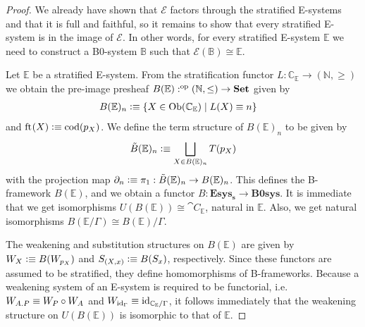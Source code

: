 \begin{proof}
We already have shown that $\mathcal{E}$ factors through the stratified
E-systems and that it is full and faithful, so it remains
to show that every stratified E-system is in the image of $\mathcal{E}$. In
other words, for every stratified E-system $\mathbb{E}$ we need to construct
a B0-system $\mathbb{B}$ such that $\mathcal{E}(\mathbb{B})\cong\mathbb{E}$. 

Let $\mathbb{E}$ be a stratified E-system. From the stratification functor
$L:\mathbb{C}_{\mathbb{E}}\to (\mathbb{N},\geq)$ we obtain the pre-image
presheaf $B(\mathbb{E}):\op{(\mathbb{N},\leq)}\to\mathbf{Set}$ given by
\begin{align*}
B(\mathbb{E})_n & \defeq \{X\in\mathrm{Ob}(\mathbb{C}_{\mathbb{E}})\mid L(X)\jdeq n\}
\end{align*}
and $\eft(X)\defeq\mathrm{cod}(p_X)$. We define the term structure of $B(\mathbb{E})_n$
to be given by
\begin{equation*}
\tilde{B}(\mathbb{E})_n \defeq \bigsqcup_{X\in B(\mathbb{E})_n} T(p_X)
\end{equation*}
with the projection map $\ebd[n]\defeq\pi_1:\tilde{B}(\mathbb{E})_n\to B(\mathbb{E})_n$.
This defines the B-framework $B(\mathbb{E})$, and we obtain a functor
$B:\mathbf{Esys_s}\to\mathbf{B0sys}$. It is immediate that we get isomorphisms
$U(B(\mathbb{E}))\cong\cat{C}_{\mathbb{E}}$, natural in $\mathbb{E}$. Also, we
get natural isomorphisms $B(\mathbb{E}/\Gamma)\cong B(\mathbb{E})/\Gamma$. 

The weakening and substitution structures on
$B(\mathbb{E})$ are given by $W_X\defeq B(W_{p_X})$ and $S_{(X,x)}\defeq B(S_x)$,
respectively. Since these functors are assumed to be stratified, they define
homomorphisms of B-frameworks. Because a weakening system of an E-system is
required to be functorial, i.e.~$W_{\ctxext{A}{P}}\jdeq W_P\circ W_A$ and
$W_{\catid{\Gamma}}\jdeq\catid{\cat{C}_{\mathbb{E}}/\Gamma}$, it follows
immediately that the weakening structure on $U(B(\mathbb{E}))$ is isomorphic to
that of $\mathbb{E}$. 
\end{proof}

